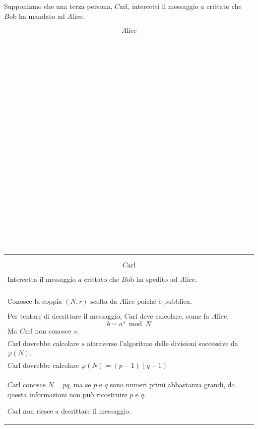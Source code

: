 \documentclass[a4paper,12pt, oneside]{book}
\begin{document}
\newpage

Supponiamo che una terza persona, $C\mbox{arl}$, intercetti il messaggio $a$ crittato che $B\mbox{ob}$ ha mandato ad $A\mbox{lice}$.\\

\begin{minipage}{0.20\textwidth}

	$$A\mbox{lice}$$\\\\\\\\\\\\\\\\\\\\\\\\\\\\\\\\\\\\\\\\\\\\

\end{minipage}%
\hfill
\begin{minipage}{0.50\textwidth}
	\begin{tabular}{|p{\textwidth}}

		$$C\mbox{arl}$$

		Intercetta il messaggio $a$ crittato che $B$ob ha spedito ad $A$lice.                            \\\\
		Conosce la coppia $(N, r)$ scelta da $A$lice poiché è pubblica.                                  \\\\
		Per tentare di decrittare il messaggio, $C$arl deve calcolare, come fa $A$lice,
		$$b = a^s \bmod N$$
		Ma $C$arl non conosce $s$.                                                                       \\
		$C$arl dovrebbe calcolare $s$ attraverso l'algoritmo delle divisioni successive da $\varphi(N)$. \\
		$C$arl dovrebbe calcolare $\varphi(N) = (p-1)(q-1)$                                              \\
		$C$arl conosce $N=pq$, ma se $p$ e $q$ sono numeri primi abbastanza grandi, da questa informazioni non può ricostruire $p$ e $q$.

		$C$arl non riesce a decrittare il messaggio.
	\end{tabular}
\end{minipage}%
\end{document}
